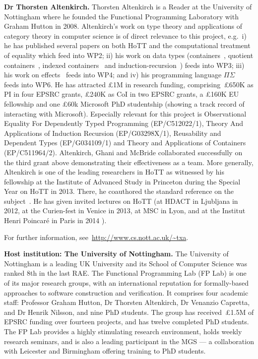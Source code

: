 \documentclass[a4paper,11pt]{article}
\newcommand{\eg}{{e.g.}\ }
\begin{document}
\newpage \textbf{Dr Thorsten Altenkirch.}  Thorsten Altenkirch is a
Reader at the University of Nottingham where he founded the Functional
Programming Laboratory with Graham Hutton in 2008. Altenkirch's
work on type theory and applications of category theory
in computer science is of direct relevance to this project, \eg i) he has
published several papers on both HoTT and the computational treatment
of equality
\cite{altenkirch:extSetoids,alti:ott-conf,alti:csl12,alti:tlca13-hedberg}
which feed into WP2; ii) his work on data types 
(containers~\cite{alti:cont-tcs}, quotient
containers~\cite{alti:mpc04}, indexed
containers~\cite{altenkirchGhaniHancockMcBrideMorris:indexedContainers}
and
induction-recursion~\cite{ghani:fibredIR})
feeds into WP3; iii) his work on
effects~\cite{alti:catind2} feeds into WP4; and iv) his programming
language $\Pi\Sigma$~\cite{alti:pisigma-new} feeds into WP6. He
has attracted \pounds 1M in research funding,
comprising~\pounds650K  as PI in four EPSRC grants, \pounds240K
as CoI in two EPSRC grants,  a \pounds160K EU fellowship and
one \pounds 60k Microsoft PhD 
studentship (showing a track record of interacting with
Microsoft). Especially relevant for this project is
Observational Equality For Dependently Typed Programming
(EP/C512022/1), Theory And Applications of Induction Recursion
(EP/G03298X/1), Reusability and Dependent Types (EP/G034109/1) and
Theory and Applications of Containers (EP/C511964/2).  Altenkirch,
Ghani and McBride collaborated successfully on the third grant above
demonstrating their effectiveness as a team. More
generally, Altenkirch is one of the leading researchers in HoTT as
witnessed by his fellowship at the Institute of Advanced Study in
Princeton during the Special Year on HoTT in 2013. There, he
coauthored the standard reference on the subject~\cite{hott-book}.  He
has given invited lectures on HoTT (at HDACT in Ljubljana in 2012, at
the Curien-fest in Venice in 2013, at MSC in Lyon, and at the Institut
Henri Poincar\'e in Paris in 2014 \cite{txa-ihp14}).

For further information, see~\url{http://www.cs.nott.ac.uk/~txa}.

\textbf{Host institution: The University of Nottingham.}  The
University of Nottingham is a leading UK University 
and its School of Computer Science was ranked 8th in the last RAE. The Functional Programming Lab (FP Lab)
is one of its major research groups, with an international
reputation for formally-based approaches to software
construction and verification.  It comprises four
academic staff: Professor Graham Hutton, Dr Thorsten Altenkirch, Dr
Venanzio Capretta, and Dr Henrik Nilsson, and nine PhD students.
The group has received~\pounds1.5M of EPSRC funding over fourteen
projects, and has twelve completed PhD students.
The FP Lab provides a highly stimulating research environment,
holds weekly research seminars, and is also a leading participant in the MGS
--- a collaboration with Leicester and Birmingham offering training
to PhD students.
\noindent
\end{document}
